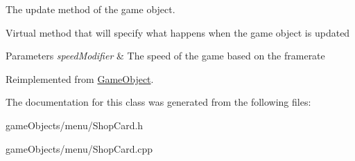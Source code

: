 The update method of the game object. 

Virtual method that will specify what happens when the game object is updated 
\begin{DoxyParams}{Parameters}
{\em speed\+Modifier} & The speed of the game based on the framerate \\
\hline
\end{DoxyParams}


Reimplemented from \hyperlink{class_game_object_acf6423054877d1344b6e0b1f4e740df5}{Game\+Object}.



The documentation for this class was generated from the following files\+:\begin{DoxyCompactItemize}
\item 
game\+Objects/menu/Shop\+Card.\+h\item 
game\+Objects/menu/Shop\+Card.\+cpp\end{DoxyCompactItemize}
